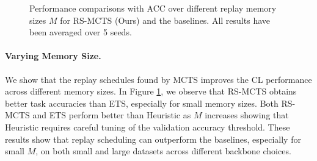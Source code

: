 \vspace{-3mm}
\begin{figure}
	\vspace{-3mm}
	\hspace{-11mm}
	\setlength{\figwidth}{0.36\textwidth}
	\setlength{\figheight}{.16\textheight}
	\resizebox{0.58\textwidth}{!}{
		
	}
	\vspace{-7mm}
	\captionsetup{width=.9\linewidth}
	\caption{Performance comparisons with ACC over different replay memory sizes $M$ for RS-MCTS (Ours) and the baselines. All results have been averaged over 5 seeds. %
	}
	\vspace{-3mm}
	\label{fig:acc_over_memory_size}
\end{figure}
\paragraph{Varying Memory Size.} We show that the replay schedules found by MCTS improves the CL performance across different memory sizes. In Figure \ref{fig:acc_over_memory_size}, we observe that RS-MCTS obtains better task accuracies than ETS, especially for small memory sizes. Both RS-MCTS and ETS perform better than Heuristic as $M$ increases showing that Heuristic requires careful tuning of the validation accuracy threshold. These results show that replay scheduling can outperform the baselines, especially for small $M$, on both small and large datasets across different backbone choices.



\vspace{-3mm}
